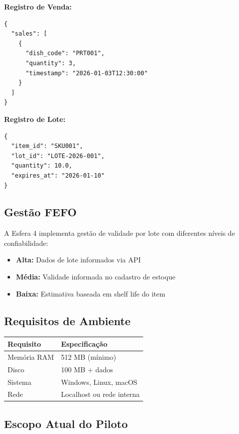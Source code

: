 \textbf{Registro de Venda:}

\begin{verbatim}
{
  "sales": [
    {
      "dish_code": "PRT001",
      "quantity": 3,
      "timestamp": "2026-01-03T12:30:00"
    }
  ]
}
\end{verbatim}

\textbf{Registro de Lote:}

\begin{verbatim}
{
  "item_id": "SKU001",
  "lot_id": "LOTE-2026-001",
  "quantity": 10.0,
  "expires_at": "2026-01-10"
}
\end{verbatim}

\subsection{Gestão FEFO}

A Esfera 4 implementa gestão de validade por lote com diferentes níveis
de confiabilidade:

\begin{itemize}[leftmargin=2em]
  \item \textbf{Alta:} Dados de lote informados via API
  \item \textbf{Média:} Validade informada no cadastro de estoque
  \item \textbf{Baixa:} Estimativa baseada em shelf life do item
\end{itemize}

\subsection{Requisitos de Ambiente}

\begin{center}
\begin{tabular}{l l}
\toprule
\textbf{Requisito} & \textbf{Especificação} \\
\midrule
Memória RAM      & 512 MB (mínimo) \\
Disco            & 100 MB + dados \\
Sistema          & Windows, Linux, macOS \\
Rede             & Localhost ou rede interna \\
\bottomrule
\end{tabular}
\end{center}

\subsection{Escopo Atual do Piloto}


